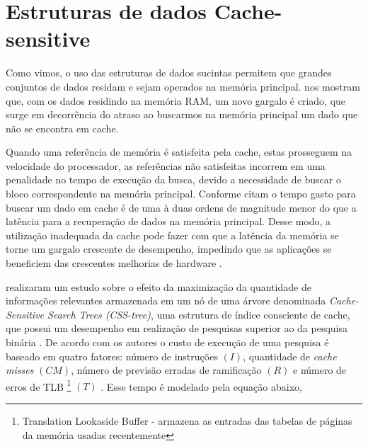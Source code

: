 



\section{Estruturas de dados Cache-sensitive}\label{sec:cache-sensitive}

Como vimos, o uso das estruturas de dados sucintas permitem que grandes conjuntos de dados residam e sejam operados na memória principal.  \citet{paper-effect-node-size-cache-b-trees} nos mostram que, com os  dados residindo na memória RAM, um novo gargalo é criado, que surge em decorrência do atraso ao buscarmos na memória principal um dado que não se encontra em cache. 

Quando uma referência de memória é satisfeita pela cache, estas prosseguem na velocidade do processador, as referências não satisfeitas incorrem em uma penalidade no tempo de execução da busca, devido a necessidade de buscar o bloco correspondente na memória principal. Conforme citam \citet{paper-effect-node-size-cache-b-trees} o tempo gasto para buscar um dado em cache é de uma à duas ordens de magnitude menor do que a latência para a recuperação de dados na memória principal. Desse modo, a utilização inadequada da cache pode fazer com que a latência da memória se torne um gargalo crescente de desempenho, impedindo que as aplicações se beneficiem das crescentes melhorias de hardware \citep{paper-making-btree-cache}.
 
\citet{paper-effect-node-size-cache-b-trees} realizaram um estudo sobre o efeito da maximização da quantidade de informações relevantes armazenada em um nó de uma árvore denominada \textit{Cache-Sensitive Search Trees (CSS-tree)}, uma estrutura de índice consciente de cache, que possui um desempenho em realização de pesquisas superior ao da pesquisa binária \citep{paper-making-btree-cache}. De acordo com os autores o custo de execução de uma pesquisa é baseado em quatro fatores: número de instruções $(I)$, quantidade de \textit{cache misses} $(CM)$, número de previsão  erradas de ramificação $(R)$ e número de erros de TLB \footnote{ Translation Lookaside Buffer  - armazena as entradas das tabelas de páginas da memória usadas recentemente}  $(T)$ \citep{paper-effect-node-size-cache-b-trees}.  Esse tempo é modelado pela equação abaixo,

